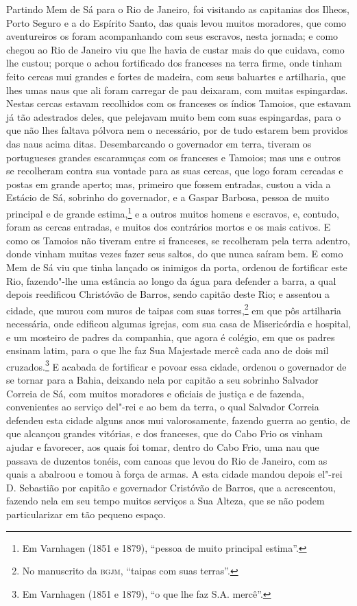 Partindo Mem de Sá para o Rio de Janeiro, foi visitando as capitanias dos Ilheos, Porto
Seguro e a do Espírito Santo, das quais levou muitos moradores, que como aventureiros os
foram acompanhando com seus escravos, nesta jornada; e como chegou ao Rio de Janeiro viu
que lhe havia de custar mais do que cuidava, como lhe custou; porque o achou fortificado
dos franceses na terra firme, onde tinham feito cercas mui grandes e fortes de madeira,
com seus baluartes e artilharia, que lhes umas naus que ali foram carregar de pau
deixaram, com muitas espingardas. Nestas cercas estavam recolhidos com os franceses os
índios Tamoios, que estavam já tão adestrados deles, que pelejavam muito bem com suas
espingardas, para o que não lhes faltava pólvora nem o necessário, por de tudo estarem bem
providos das naus acima ditas. Desembarcando o governador em terra, tiveram os portugueses
grandes escaramuças com os franceses e Tamoios; mas uns e outros se recolheram contra sua
vontade para as suas cercas, que logo foram cercadas e postas em grande aperto; mas,
primeiro que fossem entradas, custou a vida a Estácio de Sá, sobrinho do governador, e a
Gaspar Barbosa, pessoa de muito principal e de grande estima,\footnote{ Em Varnhagen (1851
e 1879), ``pessoa de muito principal estima''.} e a outros muitos homens e escravos, e,
contudo, foram as cercas entradas, e muitos dos contrários mortos e os mais cativos. E
como os Tamoios não tiveram entre si franceses, se recolheram pela terra adentro, donde
vinham muitas vezes fazer seus saltos, do que nunca saíram bem. E como Mem de Sá viu que
tinha lançado os inimigos da porta, ordenou de fortificar este Rio, fazendo"-lhe uma
estância ao longo da água para defender a barra, a qual depois reedificou Christóvão de
Barros, sendo capitão deste Rio; e assentou a cidade, que murou com muros de taipas com
suas torres,\footnote{ No manuscrito da \textsc{bgjm}, ``taipas com suas terras''.} em que
pôs artilharia necessária, onde edificou algumas igrejas, com sua casa de Misericórdia e
hospital, e um mosteiro de padres da companhia, que agora é colégio, em que os padres
ensinam latim, para o que lhe faz Sua Majestade mercê cada ano de dois mil
cruzados.\footnote{ Em Varnhagen (1851 e 1879), ``o que lhe faz S.A. mercê''.} E acabada
de fortificar e povoar essa cidade, ordenou o governador de se tornar para a Bahia,
deixando nela por capitão a seu sobrinho Salvador Correia de Sá, com muitos moradores e
oficiais de justiça e de fazenda, convenientes ao serviço del"-rei e ao bem da terra, o
qual Salvador Correia defendeu esta cidade alguns anos mui valorosamente, fazendo guerra
ao gentio, de que alcançou grandes vitórias, e dos franceses, que do Cabo Frio os vinham
ajudar e favorecer, aos quais foi tomar, dentro do Cabo Frio, uma nau que passava de
duzentos tonéis, com canoas que levou do Rio de Janeiro, com as quais a abalroou e tomou à
força de armas. A esta cidade mandou depois el"-rei D. Sebastião por capitão e governador
Cristóvão de Barros, que a acrescentou, fazendo nela em seu tempo muitos serviços a Sua
Alteza, que se não podem particularizar em tão pequeno espaço.

